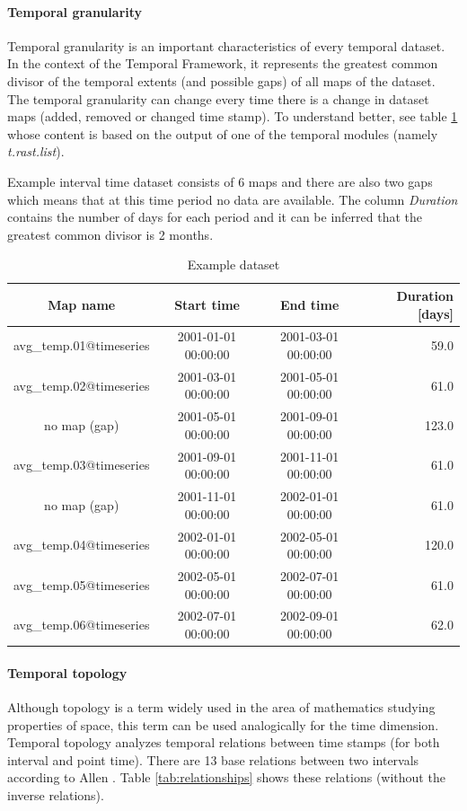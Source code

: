 \documentclass[a4paper,12pt,oneside]{book}
\newcommand{\module}[1]{\textsl{#1}}
\newcommand{\tf}{Temporal Framework\xspace}
\begin{document}
\paragraph{Temporal granularity}
\label{sec:temporalGranularity}
Temporal granularity is an important characteristics of every temporal dataset.
In the context of the \tf , it represents the greatest common divisor
of the temporal extents (and possible gaps) of all maps of the dataset.
The temporal granularity can change every time there is a change in dataset maps
(added, removed or changed time stamp).
To understand better, see table \ref{tab:granularity} whose content is based on the output
of one of the temporal modules (namely \module{t.rast.list}).

Example interval time dataset consists of 6 maps and
there are also two gaps which means that at this time period no data are available.
The column \emph{Duration} contains the number of days for each period and it can be inferred
that the greatest common divisor is 2 months.
\begin{table}[ht!]
  \centering
  \small
  \caption{Example dataset}
  \label{tab:granularity}
\setlength{\extrarowheight}{3pt}
\begin{tabular}{cccr}
\toprule
 Map name & Start time & End time & Duration [days]\\\midrule
avg\_temp.01@timeseries &    2001-01-01 00:00:00  &   2001-03-01 00:00:00  &   59.0\\
avg\_temp.02@timeseries  &  2001-03-01 00:00:00  &   2001-05-01 00:00:00   &  61.0\\
no map (gap)    &  2001-05-01 00:00:00    & 2001-09-01 00:00:00   &  123.0\\
avg\_temp.03@timeseries     & 2001-09-01 00:00:00   &  2001-11-01 00:00:00  &   61.0\\
no map (gap) &   2001-11-01 00:00:00   &  2002-01-01 00:00:00  &   61.0 \\
avg\_temp.04@timeseries  &    2002-01-01 00:00:00   &  2002-05-01 00:00:00     & 120.0 \\
avg\_temp.05@timeseries  &      2002-05-01 00:00:00 &    2002-07-01 00:00:00 &    61.0 \\
avg\_temp.06@timeseries &     2002-07-01 00:00:00  &   2002-09-01 00:00:00   &  62.0\\
\bottomrule
\end{tabular}
\end{table}


\paragraph{Temporal topology}
\label{sec:temporalTopology}
Although topology is a term widely used in the area of mathematics studying properties of space,
this term can be used analogically for the time dimension.
Temporal topology analyzes temporal relations between time stamps (for both interval and point time).
There are 13 base relations between two intervals according to Allen \cite{relationships}.
Table \ref{tab:relationships} shows these relations (without the inverse relations).
\end{document}
